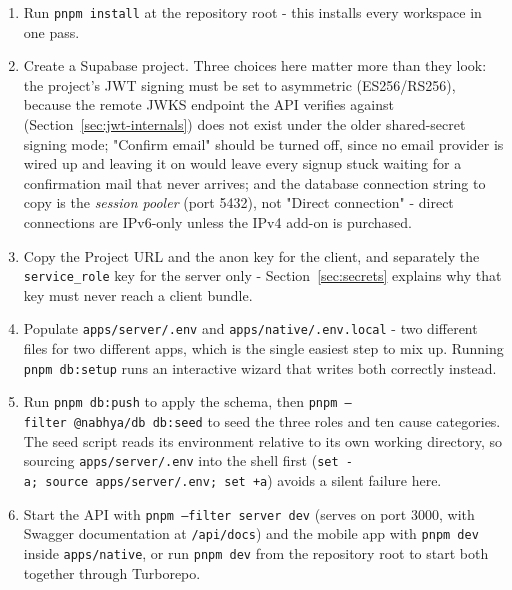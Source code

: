 \begin{enumerate}
  \item Run \texttt{pnpm install} at the repository root - this installs every workspace in one pass.
  \item Create a Supabase project. Three choices here matter more than they look: the project's JWT signing must be set to asymmetric (ES256/RS256), because the remote JWKS endpoint the API verifies against (Section~\ref{sec:jwt-internals}) does not exist under the older shared-secret signing mode; "Confirm email" should be turned off, since no email provider is wired up and leaving it on would leave every signup stuck waiting for a confirmation mail that never arrives; and the database connection string to copy is the \emph{session pooler} (port 5432), not "Direct connection" - direct connections are IPv6-only unless the IPv4 add-on is purchased.
  \item Copy the Project URL and the anon key for the client, and separately the \texttt{service\_role} key for the server only - Section~\ref{sec:secrets} explains why that key must never reach a client bundle.
  \item Populate \texttt{apps/\allowbreak server/\allowbreak .env} and \texttt{apps/\allowbreak native/\allowbreak .env.local} - two different files for two different apps, which is the single easiest step to mix up. Running \texttt{pnpm db:setup} runs an interactive wizard that writes both correctly instead.
  \item Run \texttt{pnpm db:push} to apply the schema, then \texttt{pnpm --filter\allowbreak\ @nabhya/db\allowbreak\ db:seed} to seed the three roles and ten cause categories. The seed script reads its environment relative to its own working directory, so sourcing \texttt{apps/\allowbreak server/\allowbreak .env} into the shell first (\texttt{set -a;\allowbreak\ source\allowbreak\ apps/\allowbreak server/\allowbreak .env;\allowbreak\ set +a}) avoids a silent failure here.
  \item Start the API with \texttt{pnpm --filter\allowbreak\ server dev} (serves on port 3000, with Swagger documentation at \texttt{/api/\allowbreak docs}) and the mobile app with \texttt{pnpm dev} inside \texttt{apps/\allowbreak native}, or run \texttt{pnpm dev} from the repository root to start both together through Turborepo.
\end{enumerate}

